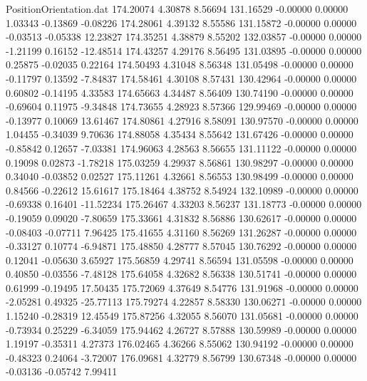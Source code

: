 \begin{filecontents}{PositionOrientation.dat}
 174.20074    4.30878    8.56694   131.16529   -0.00000    0.00000    1.03343   -0.13869   -0.08226
 174.28061    4.39132    8.55586   131.15872   -0.00000    0.00000   -0.03513   -0.05338   12.23827
 174.35251    4.38879    8.55202   132.03857   -0.00000    0.00000   -1.21199    0.16152  -12.48514
 174.43257    4.29176    8.56495   131.03895   -0.00000    0.00000    0.25875   -0.02035    0.22164
 174.50493    4.31048    8.56348   131.05498   -0.00000    0.00000   -0.11797    0.13592   -7.84837
 174.58461    4.30108    8.57431   130.42964   -0.00000    0.00000    0.60802   -0.14195    4.33583
 174.65663    4.34487    8.56409   130.74190   -0.00000    0.00000   -0.69604    0.11975   -9.34848
 174.73655    4.28923    8.57366   129.99469   -0.00000    0.00000   -0.13977    0.10069   13.61467
 174.80861    4.27916    8.58091   130.97570   -0.00000    0.00000    1.04455   -0.34039    9.70636
 174.88058    4.35434    8.55642   131.67426   -0.00000    0.00000   -0.85842    0.12657   -7.03381
 174.96063    4.28563    8.56655   131.11122   -0.00000    0.00000    0.19098    0.02873   -1.78218
 175.03259    4.29937    8.56861   130.98297   -0.00000    0.00000    0.34040   -0.03852    0.02527
 175.11261    4.32661    8.56553   130.98499   -0.00000    0.00000    0.84566   -0.22612   15.61617
 175.18464    4.38752    8.54924   132.10989   -0.00000    0.00000   -0.69338    0.16401  -11.52234
 175.26467    4.33203    8.56237   131.18773   -0.00000    0.00000   -0.19059    0.09020   -7.80659
 175.33661    4.31832    8.56886   130.62617   -0.00000    0.00000   -0.08403   -0.07711    7.96425
 175.41655    4.31160    8.56269   131.26287   -0.00000    0.00000   -0.33127    0.10774   -6.94871
 175.48850    4.28777    8.57045   130.76292   -0.00000    0.00000    0.12041   -0.05630    3.65927
 175.56859    4.29741    8.56594   131.05598   -0.00000    0.00000    0.40850   -0.03556   -7.48128
 175.64058    4.32682    8.56338   130.51741   -0.00000    0.00000    0.61999   -0.19495   17.50435
 175.72069    4.37649    8.54776   131.91968   -0.00000    0.00000   -2.05281    0.49325  -25.77113
 175.79274    4.22857    8.58330   130.06271   -0.00000    0.00000    1.15240   -0.28319   12.45549
 175.87256    4.32055    8.56070   131.05681   -0.00000    0.00000   -0.73934    0.25229   -6.34059
 175.94462    4.26727    8.57888   130.59989   -0.00000    0.00000    1.19197   -0.35311    4.27373
 176.02465    4.36266    8.55062   130.94192   -0.00000    0.00000   -0.48323    0.24064   -3.72007
 176.09681    4.32779    8.56799   130.67348   -0.00000    0.00000   -0.03136   -0.05742    7.99411

\end{filecontents}
